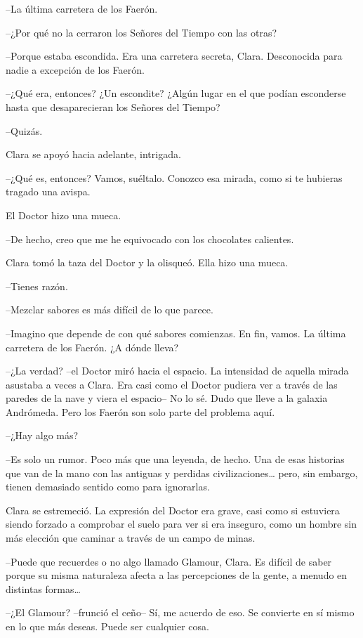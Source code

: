 {--La última carretera de los Faerón.}

{--¿Por qué no la cerraron los Señores del Tiempo con las otras?}

{--Porque estaba escondida. Era una carretera secreta, Clara. Desconocida
para nadie a excepción de los Faerón.}

{--¿Qué era, entonces? ¿Un escondite? ¿Algún lugar en el que podían
esconderse hasta que desaparecieran los Señores del Tiempo?}

{--Quizás.}

{Clara se apoyó hacia adelante, intrigada.}

{--¿Qué es, entonces? Vamos, suéltalo. Conozco esa mirada, como si te
hubieras tragado una avispa.}

{El Doctor hizo una mueca.}

{--De hecho, creo que me he equivocado con los chocolates calientes.}

{Clara tomó la taza del Doctor y la olisqueó. Ella hizo una mueca.}

{--Tienes razón.}

{--Mezclar sabores es más difícil de lo que parece.}

{--Imagino que depende de con qué sabores comienzas. En fin, vamos. La
última carretera de los Faerón. ¿A dónde lleva?}

{--¿La verdad? --el Doctor miró hacia el espacio. La intensidad de
 aquella mirada asustaba a veces a Clara. Era casi como el Doctor pudiera
 ver a través de las paredes de la nave y viera el espacio-- No lo sé.
 Dudo que lleve a la galaxia Andrómeda. Pero los Faerón son solo parte
del problema aquí.}

{--¿Hay algo más?}

{--Es solo un rumor. Poco más que una leyenda, de hecho. Una de esas
 historias que van de la mano con las antiguas y perdidas
 civilizaciones\ldots{} pero, sin embargo, tienen demasiado sentido como
para ignorarlas.}

{Clara se estremeció. La expresión del Doctor era grave, casi como si
 estuviera siendo forzado a comprobar el suelo para ver si era inseguro,
 como un hombre sin más elección que caminar a través de un campo de
minas.}

{--Puede que recuerdes o no algo llamado Glamour, Clara. Es difícil de
 saber porque su misma naturaleza afecta a las percepciones de la gente,
 a menudo en distintas formas\ldots{}}

{--¿El Glamour? --frunció el ceño-- Sí, me acuerdo de eso. Se convierte
en sí mismo en lo que más deseas. Puede ser cualquier cosa.}

